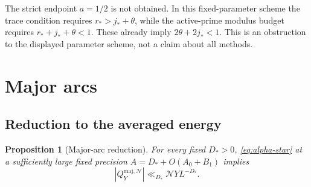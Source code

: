 \documentclass[11pt]{article}
\newtheorem{proposition}[theorem]{Proposition}
\theoremstyle{definition}
\newcommand{\GN}{\mathcal N}
\newcommand{\Qmaj}{Q_Y^{\mathrm{maj},\GN}}
\theoremstyle{remark}
\numberwithin{equation}{section}
\begin{document}
The strict endpoint $a=1/2$ is not obtained. In this fixed-parameter scheme the trace condition requires $r_*>j_*+\theta$, while the active-prime modulus budget requires $r_*+j_*+\theta<1$. These already imply $2\theta+2j_*<1$. This is an obstruction to the displayed parameter scheme, not a claim about all methods.

\section{Major arcs}\label{sec:major}
\subsection{Reduction to the averaged energy}\label{subsec:arc-reduction}
\begin{proposition}[Major-arc reduction]\label{prop:arc-reduction}
For every fixed $D_*>0$, \eqref{eq:alpha-star} at a sufficiently
large fixed precision $A=D_*+O(A_0+B_1)$ implies
\begin{equation}\label{eq:major-bound}
 |\Qmaj|\ll_{D_*}\GN YL^{-D_*}.
\end{equation}
\end{proposition}
\end{document}
